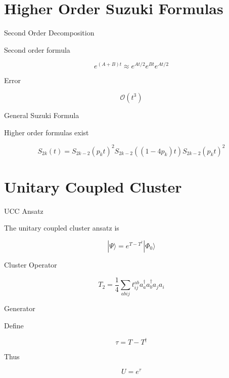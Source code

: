 \documentclass{beamer}
\begin{document}
\section{Higher Order Suzuki Formulas}

\begin{frame}{Second Order Decomposition}

  Second order formula

  \[
  e^{(A+B)t}
  \approx
  e^{A t/2} e^{B t} e^{A t/2}
  \]

  Error

  \[
  \mathcal{O}(t^3)
  \]

\end{frame}

\begin{frame}{General Suzuki Formula}

  Higher order formulas exist

  \[
  S_{2k}(t)
  =
  S_{2k-2}(p_k t)^2
  S_{2k-2}((1-4p_k)t)
  S_{2k-2}(p_k t)^2
  \]

\end{frame}

\section{Unitary Coupled Cluster}

\begin{frame}{UCC Ansatz}

  The unitary coupled cluster ansatz is

  \[
  |\Psi\rangle =
  e^{T-T^\dagger}|\Phi_0\rangle
  \]

\end{frame}

\begin{frame}{Cluster Operator}

  \[
  T_2 =
  \frac14
  \sum_{abij}
  t_{ij}^{ab}
  a_a^\dagger a_b^\dagger a_j a_i
  \]

\end{frame}

\begin{frame}{Generator}

  Define

  \[
  \tau = T-T^\dagger
  \]

  Thus

  \[
  U = e^{\tau}
  \]

\end{frame}
\end{document}
